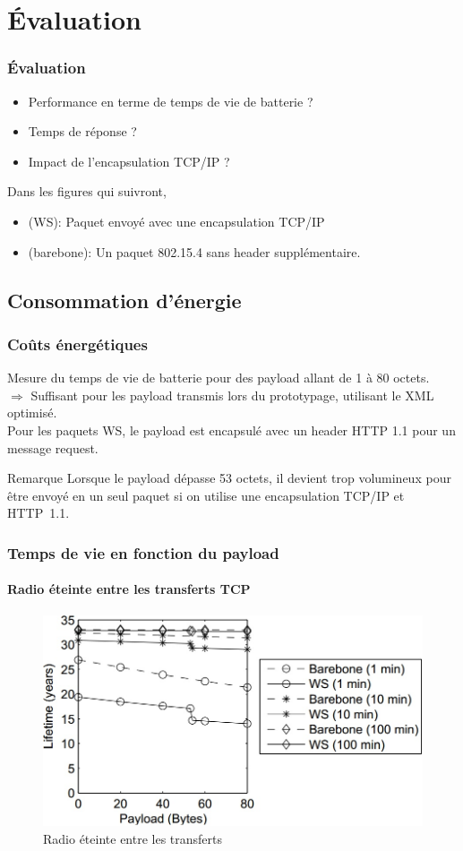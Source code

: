\section{Évaluation}
\begin{frame}
\frametitle{Évaluation}
\begin{itemize}
 \item Performance en terme de temps de vie de batterie ?
 \item Temps de réponse ?
 \item Impact de l'encapsulation TCP/IP ?
\end{itemize}
\vspace{5mm}
Dans les figures qui suivront,
\begin{itemize}
 \item (WS): Paquet envoyé avec une encapsulation TCP/IP %
 \item (barebone): Un paquet 802.15.4 sans header supplémentaire.
\end{itemize}
\end{frame}

\subsection{Consommation d'énergie}
\begin{frame}
 \frametitle{Coûts énergétiques}
 Mesure du temps de vie de batterie pour des payload allant de 1 à 80 octets.\\
 $\Rightarrow$ Suffisant pour les payload transmis lors du prototypage, utilisant le XML optimisé.\\
 Pour les paquets WS, le payload est encapsulé avec un header HTTP 1.1 pour un message request.
 \begin{block}{Remarque}
  Lorsque le payload dépasse 53 octets, il devient trop volumineux pour être envoyé en un seul paquet si on utilise une encapsulation TCP/IP et HTTP~1.1.
 \end{block}
\end{frame}

\def \radiosca {0.4}
\begin{frame}
 \frametitle{Temps de vie en fonction du payload}
 \framesubtitle{Radio éteinte entre les transferts TCP}
 \begin{figure}
  \centering
  \includegraphics[scale=\radiosca]{figures/radiooff.jpg}
  \caption{Radio éteinte entre les transferts}
 \end{figure} 
\end{frame}

